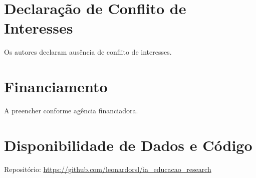 \documentclass[preprint,12pt,authoryear]{elsarticle}
\begin{document}
\section*{Declaração de Conflito de Interesses}
Os autores declaram ausência de conflito de interesses.

\section*{Financiamento}
A preencher conforme agência financiadora.

\section*{Disponibilidade de Dados e Código}
Repositório: \url{https://github.com/leonardorsl/ia_educacao_research}



\end{document}

